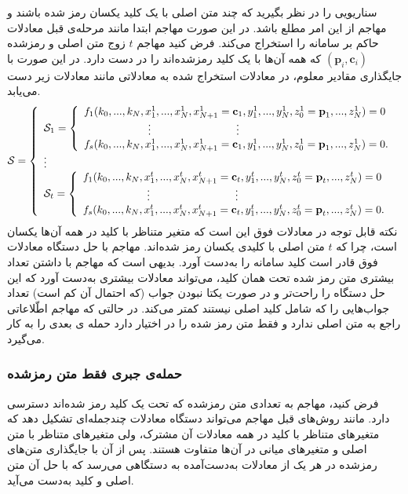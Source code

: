 سناریویی را در نظر بگیرید که چند متن اصلی با یک کلید یکسان رمز شده باشند و مهاجم از این امر مطلع باشد. در این صورت مهاجم ابتدا مانند مرحله‌ی قبل معادلات حاکم بر سامانه را استخراج می‌کند. فرض کنید مهاجم 
$t$
زوج متن اصلی و رمزشده  
$(\textbf{p}_{i},\textbf{c}_{i})$
که همه‌  آن‌ها با یک کلید رمزشده‌اند را در دست دارد. در این صورت با جایگذاری مقادیر معلوم، در معادلات استخراج شده به معادلاتی مانند معادلات زیر دست می‌یابد.
\begin{align*}
\mS = \left \{ \begin{array}{ll}
\mS_{1} = \left \{ \begin{array}{ll}
f_{1}(k_{0},...,k_{N},x_{1}^{1},...,x_{N}^{1}, x_{N+1}^{1} = \textbf{c}_{1} ,y_{1}^{1},...,y_{N}^{1},z_{0}^{1} = \textbf{p}_{1},...,z_{N}^{1}) = 0\\
\quad\quad\tab\tab\vdots\tab\tab\tab\quad\quad\vdots\\
f_{s}(k_{0},...,k_{N},x_{1}^{1},...,x_{N}^{1}, x_{N+1}^{1} = \textbf{c}_{1},y_{1}^{1},...,y_{N}^{1},z_{0}^{1} = \textbf{p}_{1},...,z_{N}^{1}) = 0.
\end{array} \right.
\\
\vdots\\
\mS_{t} = \left \{ \begin{array}{ll}
f_{1}(k_{0},...,k_{N},x_{1}^{t},...,x_{N}^{t}, x_{N+1}^{t} = \textbf{c}_{t},y_{1}^{t},...,y_{N}^{t},z_{0}^{t} = \textbf{p}_{t},...,z_{N}^{t}) = 0\\
\quad\quad\tab\tab\vdots\tab\tab\tab\quad\quad\vdots\\
f_{s}(k_{0},...,k_{N},x_{1}^{t},...,x_{N}^{t}, x_{N+1}^{t} = \textbf{c}_{t},y_{1}^{t},...,y_{N}^{t},z_{0}^{t} = \textbf{p}_{t},...,z_{N}^{t}) = 0.
\end{array} \right.
\end{array} \right.
\end{align*}
نکته‌  قابل توجه در معادلات فوق این است که متغیر متناظر با کلید در همه‌  آن‌ها یکسان است، چرا که 
$t$
متن اصلی با کلیدی یکسان رمز شده‌اند. مهاجم با حل دستگاه معادلات فوق قادر است کلید سامانه را به‌دست آورد. بدیهی است که مهاجم با داشتن تعداد بیشتری متن رمز شده‌  تحت همان کلید، می‌تواند معادلات بیشتری به‌دست آورد که این حل دستگاه را راحت‌تر و در صورت یکتا نبودن جواب (که احتمال آن کم است) تعداد جواب‌هایی را که شامل کلید اصلی نیستند کمتر می‌کند.  در حالتی که مهاجم اطّلاعاتی راجع به متن اصلی ندارد و فقط متن رمز شده را در اختیار دارد حمله ی بعدی را به کار می‌گیرد.
\subsubsection*{حمله‌ی جبری فقط متن رمزشده}
فرض کنید، مهاجم به تعدادی متن رمز‌شده که تحت یک کلید رمز شده‌اند دسترسی دارد.  مانند روش‌های قبل مهاجم می‌تواند دستگاه معادلات چندجمله‌ای  تشکیل دهد که متغیرهای متناظر با کلید در همه معادلات آن مشترک، ولی متغیرهای متناظر با متن اصلی و متغیرهای میانی در آن‌ها متفاوت هستند. پس از آن با جایگذاری متن‌های رمزشده در هر یک از معادلات به‌دست‌آمده به دستگاهی می‌رسد که با حل آن متن اصلی و کلید به‌دست می‌آید. 

